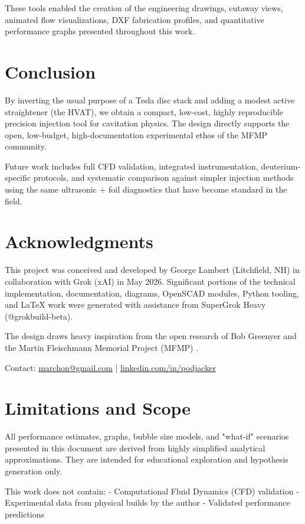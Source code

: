 \documentclass[11pt,a4paper]{article}
\begin{document}
These tools enabled the creation of the engineering drawings, cutaway views, animated flow visualizations, DXF fabrication profiles, and quantitative performance graphs presented throughout this work.

\section{Conclusion}

By inverting the usual purpose of a Tesla disc stack and adding a modest active straightener (the HVAT), we obtain a compact, low-cost, highly reproducible precision injection tool for cavitation physics. The design directly supports the open, low-budget, high-documentation experimental ethos of the MFMP community.

Future work includes full CFD validation, integrated instrumentation, deuterium-specific protocols, and systematic comparison against simpler injection methods using the same ultrasonic + foil diagnostics that have become standard in the field.

\section*{Acknowledgments}
This project was conceived and developed by George Lambert (Litchfield, NH) in collaboration with Grok (xAI) in May 2026. Significant portions of the technical implementation, documentation, diagrams, OpenSCAD modules, Python tooling, and LaTeX work were generated with assistance from SuperGrok Heavy (@grokbuild-beta).

The design draws heavy inspiration from the open research of Bob Greenyer and the Martin Fleischmann Memorial Project (MFMP) \cite{greenyer2020,greenyer2026}.

Contact: \href{mailto:marchon@gmail.com}{marchon@gmail.com} \quad | \quad \href{https://www.linkedin.com/in/podjacker}{linkedin.com/in/podjacker}

\section*{Limitations and Scope}
All performance estimates, graphs, bubble size models, and "what-if" scenarios presented in this document are derived from highly simplified analytical approximations. They are intended for educational exploration and hypothesis generation only.

This work does not contain:
- Computational Fluid Dynamics (CFD) validation
- Experimental data from physical builds by the author
- Validated performance predictions
\end{document}
